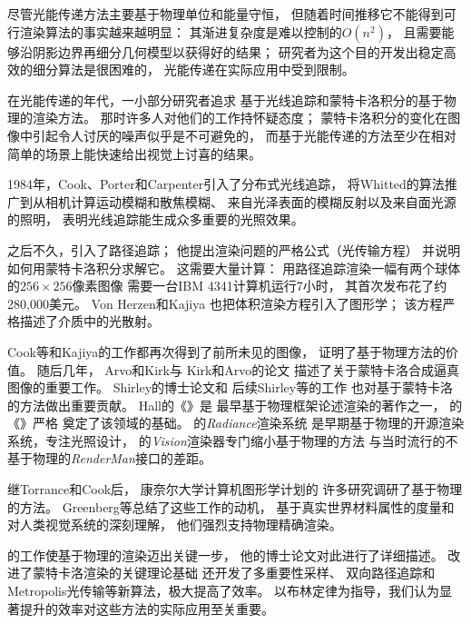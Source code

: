 尽管光能传递方法主要基于物理单位和能量守恒，
但随着时间推移它不能得到可行渲染算法的事实越来越明显：
其渐进复杂度是难以控制的$O(n^2)$，
且需要能够沿阴影边界再细分几何模型以获得好的结果；
研究者为这个目的开发出稳定高效的细分算法是很困难的，
光能传递在实际应用中受到限制。

在光能传递的年代，一小部分研究者追求
基于光线追踪和蒙特卡洛积分的基于物理的渲染方法。
那时许多人对他们的工作持怀疑态度；
蒙特卡洛积分的变化在图像中引起令人讨厌的噪声似乎是不可避免的，
而基于光能传递的方法至少在相对简单的场景上能快速给出视觉上讨喜的结果。

1984年，Cook、Porter和Carpenter\parencite*{10.1145/800031.808590}引入了分布式光线追踪，
将Whitted的算法推广到从相机计算运动模糊和散焦模糊、
来自光泽表面的模糊反射以及来自面光源的照明，
表明光线追踪能生成众多重要的光照效果。

之后不久，\citet{10.1145/15922.15902}引入了路径追踪；
他提出渲染问题的严格公式（光传输方程）
并说明如何用蒙特卡洛积分求解它。
这需要大量计算：
用路径追踪渲染一幅有两个球体的$256\times256$像素图像
需要一台IBM 4341计算机运行7小时，
其首次发布花了约280,000美元\citep{farmer1981comparing}。
Von Herzen和Kajiya\parencite*{10.1145/800031.808594}
也把体积渲染方程引入了图形学；
该方程严格描述了介质中的光散射。

Cook等和Kajiya的工作都再次得到了前所未见的图像，
证明了基于物理方法的价值。
随后几年， Arvo和Kirk\parencite*{10.1145/97879.97886}与
Kirk和Arvo\parencite*{10.1145/122718.122735}的论文
描述了关于蒙特卡洛合成逼真图像的重要工作。
Shirley的博士论文\parencite*{10.5555/124947}和
后续Shirley等\parencite*{10.1145/226150.226151}的工作
也对基于蒙特卡洛的方法做出重要贡献。
Hall的《》\parencite*{10.5555/63450}是
最早基于物理框架论述渲染的著作之一，
\citeauthor{10.5555/527570}的《》\parencite*{10.5555/527570}严格
奠定了该领域的基础。
\citet{10.1145/192161.192286}的\emph{Radiance}渲染系统
是早期基于物理的开源渲染系统，专注光照设计，
\citet{slusallek1996vision}的\emph{Vision}渲染器专门缩小基于物理的方法
与当时流行的不基于物理的\emph{RenderMan}接口的差距。

继Torrance和Cook后，
康奈尔大学计算机图形学计划的
许多研究调研了基于物理的方法。
Greenberg等\parencite*{10.1145/258734.258914}总结了这些工作的动机，
基于真实世界材料属性的度量和对人类视觉系统的深刻理解，
他们强烈支持物理精确渲染。

\citet{veach1997robust}的工作使基于物理的渲染迈出关键一步，
他的博士论文对此进行了详细描述。
\citeauthor{veach1997robust}改进了蒙特卡洛渲染的关键理论基础
还开发了多重要性采样、
双向路径追踪和Metropolis光传输等新算法，极大提高了效率。
以布林定律为指导，我们认为显著提升的效率对这些方法的实际应用至关重要。

